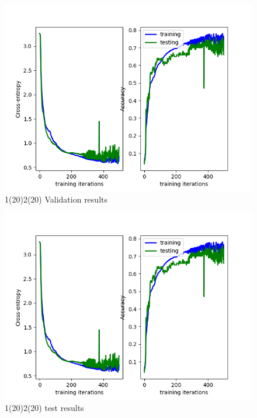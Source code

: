 \documentclass[a4paper]{report}
\begin{document}
\begin{figure}[h]
\begin{center}
\includegraphics[scale=0.5]{20200,05val.png}
\end{center}
\caption{1(20)2(20) Validation results}
\end{figure}
\begin{figure}[h]
\begin{center}
\includegraphics[scale=0.5]{20200,05val.png}
\end{center}
\caption{1(20)2(20) test results}
\end{figure}
\end{document}
